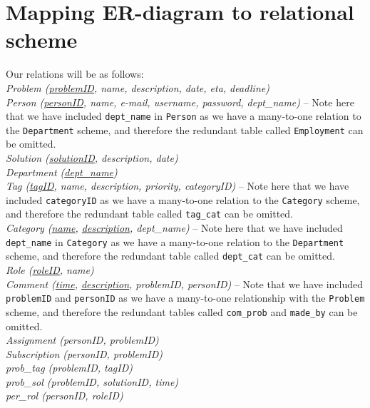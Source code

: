 \section{Mapping ER-diagram to relational scheme}
\label{sec:map_er_rel}

Our relations will be as follows:\\

\noindent\textit{Problem (\underline{problemID}, name, description, date, eta, deadline)} \\

\noindent\textit{Person (\underline{personID}, name, e-mail, username, password, dept\_name)}  -- Note here that we have included \verb+dept_name+ in \verb+Person+ as we have a many-to-one relation to the \verb+Department+ scheme, and therefore the redundant table called \verb+Employment+ can be omitted.\\

\noindent\textit{Solution (\underline{solutionID}, description, date)} \\

\noindent\textit{Department (\underline{dept\_name})} \\

\noindent\textit{Tag (\underline{tagID}, name, description, priority, categoryID)} -- Note here that we have included \verb+categoryID+ as we have a many-to-one relation to the \verb+Category+ scheme, and therefore the redundant table called \verb+tag_cat+ can be omitted.\\

\noindent\textit{Category (\underline{name}, \underline{description}, dept\_name)} -- Note here that we have included \verb+dept_name+ in \verb+Category+ as we have a many-to-one relation to the \verb+Department+ scheme, and therefore the redundant table called \verb+dept_cat+ can be omitted.\\

\noindent\textit{Role (\underline{roleID}, name)} \\

\noindent\textit{Comment (\underline{time}, \underline{description}, problemID, personID)} -- Note that we have included \verb+problemID+ and \verb+personID+ as we have a many-to-one relationship with the \verb+Problem+ scheme, and therefore the redundant tables called \verb+com_prob+ and \verb+made_by+ can be omitted.\\

\noindent\textit{Assignment (personID, problemID)} \\

\noindent\textit{Subscription (personID, problemID)} \\

\noindent\textit{prob\_tag (problemID, tagID)} \\

\noindent\textit{prob\_sol (problemID, solutionID, time)} \\

\noindent\textit{per\_rol (personID, roleID)} \\